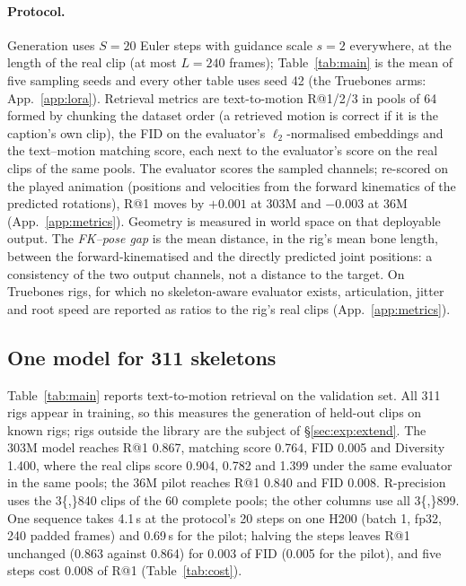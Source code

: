\paragraph{Protocol.} Generation uses $S{=}20$ Euler steps with guidance scale $s{=}2$ everywhere, at the
length of the real clip (at most $L{=}240$ frames); Table~\ref{tab:main} is the mean of five sampling seeds and every other table uses seed 42 (the Truebones arms:
App.~\ref{app:lora}). Retrieval metrics are text-to-motion R@1/2/3 in
pools of 64 formed by chunking the dataset order (a retrieved motion is correct if it is the caption's own
clip), the FID on the evaluator's $\ell_2$-normalised embeddings and the text--motion matching score, each
next to the evaluator's score on the real clips of the same pools. The evaluator
scores the sampled channels; re-scored on the played animation (positions and velocities from the forward kinematics
of the predicted rotations), R@1 moves by $+0.001$ at \num{303}M and $-0.003$ at \num{36}M (App.~\ref{app:metrics}). Geometry is measured in world space on that
deployable output. The \emph{FK--pose gap} is the mean distance, in the rig's mean bone length, between the
forward-kinematised and the directly predicted joint positions: a consistency of the two output channels, not a
distance to the target. On Truebones rigs, for which no skeleton-aware evaluator exists, articulation, jitter and root speed
are reported as ratios to the rig's real clips (App.~\ref{app:metrics}).

\subsection{One model for 311 skeletons}\label{sec:exp:main}

Table~\ref{tab:main} reports text-to-motion retrieval on the validation set. All \num{311} rigs appear in
training, so this measures the generation of held-out clips on known rigs; rigs outside the library are
the subject of \S\ref{sec:exp:extend}. The \num{303}M model reaches R@1 \num{0.867}, matching score
\num{0.764}, FID \num{0.005} and Diversity \num{1.400}, where the real clips score \num{0.904}, \num{0.782} and
\num{1.399} under the same evaluator in the same pools; the \num{36}M pilot reaches R@1 \num{0.840} and FID
\num{0.008}. R-precision uses the \num{3{,}840} clips of the 60 complete pools; the other columns use all
\num{3{,}899}. One sequence takes \num{4.1}\,s at the protocol's 20 steps on one H200 (batch 1, fp32, 240 padded
frames) and \num{0.69}\,s for the pilot; halving the steps leaves R@1 unchanged (\num{0.863} against \num{0.864})
for \num{0.003} of FID (\num{0.005} for the pilot), and five steps cost \num{0.008} of R@1 (Table~\ref{tab:cost}).


